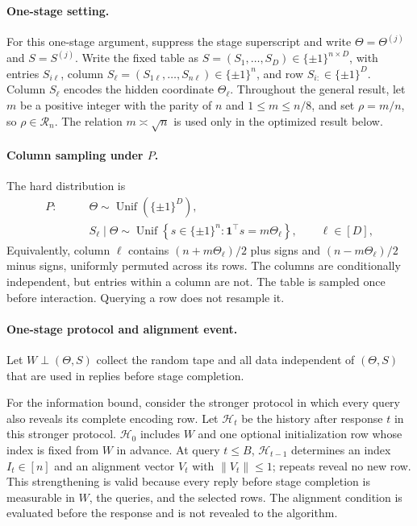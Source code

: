 \documentclass{article}
\theoremstyle{definition}
\begin{document}
\paragraph{One-stage setting.}
For this one-stage argument, suppress the stage superscript and write
$\Theta=\Theta^{(j)}$ and $S=S^{(j)}$.  Write the fixed table as
$S=(S_1,\ldots,S_D)\in\{\pm1\}^{n\times D}$, with entries $S_{i\ell}$,
column $S_\ell=(S_{1\ell},\ldots,S_{n\ell})\in\{\pm1\}^n$, and row
$S_{i:}\in\{\pm1\}^D$.  Column $S_\ell$ encodes the hidden coordinate
$\Theta_\ell$.  Throughout the general result, let $m$ be a positive integer
with the parity of $n$ and $1\le m\le n/8$, and set
$\rho=m/n$, so $\rho\in\mathcal R_n$.  The relation $m\asymp\sqrt n$ is used
only in the optimized result below.

\paragraph{Column sampling under $P$.}
The hard distribution is
\begin{equation}
 \begin{aligned}
 P:\qquad
 &\Theta\sim\operatorname{Unif}(\{\pm1\}^D),\\
 &S_\ell\mid\Theta
 \sim\operatorname{Unif}\!\left\{s\in\{\pm1\}^n:
             \mathbf 1^\top s=m\Theta_\ell\right\},
 \qquad \ell\in[D],
\end{aligned}
\label{eq:hard-distribution-P}
\end{equation}
Equivalently, column $\ell$ contains $(n+m\Theta_\ell)/2$ plus signs and
$(n-m\Theta_\ell)/2$ minus signs, uniformly permuted across its rows.  The
columns are conditionally independent, but entries within a column are not.
The table is sampled once before interaction.  Querying a row does not
resample it.

\paragraph{One-stage protocol and alignment event.}
Let $W\perp(\Theta,S)$ collect the random tape and all data independent of
$(\Theta,S)$ that are used in replies before stage completion.

For the information bound, consider the stronger protocol in which every query
also reveals its complete encoding row.  Let $\mathcal H_t$ be the history after
response $t$ in this stronger protocol.  $\mathcal H_0$ includes $W$ and one
optional initialization row whose index is fixed from $W$ in advance.  At
query $t\le B$, $\mathcal H_{t-1}$ determines an index $I_t\in[n]$ and an
alignment vector $V_t$ with $\|V_t\|\le1$; repeats reveal no new row.  This
strengthening is valid because every reply before stage completion is
measurable in $W$, the queries, and the selected rows.  The alignment condition
is evaluated before the response and is not revealed to the algorithm.
\end{document}
